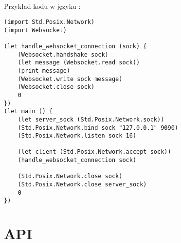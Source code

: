 \subsection{\ViuAct}

Przykład kodu w języku \ViuAct:
\begin{small}
\begin{lstlisting}
(import Std.Posix.Network)
(import Websocket)

(let handle_websocket_connection (sock) {
    (Websocket.handshake sock)
    (let message (Websocket.read sock))
    (print message)
    (Websocket.write sock message)
    (Websocket.close sock)
    0
})
(let main () {
    (let server_sock (Std.Posix.Network.sock))
    (Std.Posix.Network.bind sock "127.0.0.1" 9090)
    (Std.Posix.Network.listen sock 16)

    (let client (Std.Posix.Network.accept sock))
    (handle_websocket_connection sock)

    (Std.Posix.Network.close sock)
    (Std.Posix.Network.close server_sock)
    0
})
\end{lstlisting}
\end{small}

\section{API}
